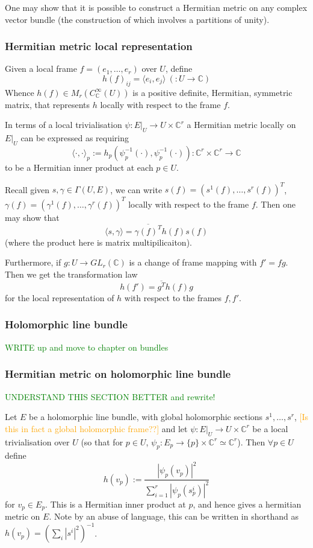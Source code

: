 \documentclass[a4paper]{article}
\theoremstyle{definition} \newtheorem*{definition}{Definition}
\theoremstyle{definition} \newtheorem*{definitions}{Definitions}
\theoremstyle{plain} \newtheorem{theorem}{Theorem}[section]
\theoremstyle{plain} \newtheorem{proposition}[theorem]{Proposition}
\theoremstyle{plain} \newtheorem{corollary}[theorem]{Corollary}
\theoremstyle{plain} \newtheorem{lemma}[theorem]{Lemma}
\theoremstyle{plain} \newtheorem{example}[theorem]{Example}
\newcommand{\question}[1]{\textcolor{orange}{#1}}
\newcommand{\finish}[1]{\textcolor{green}{#1}}
\newcommand{\complexnos}{\mathbb{C}}
\newcommand{\smoothCmaps}{C^\infty_\complexnos (U)}
\begin{document}
One may show that it is possible to construct a Hermitian metric on any complex vector bundle (the construction of which involves a partitions of unity). 

\subsubsection{Hermitian metric local representation}
Given a local frame $f=(e_1, \ldots, e_r)$ over $U$, define 
$$h(f)_{ij}=\langle e_i, e_j \rangle \ (:U\to \complexnos)$$
Whence $h(f)\in M_r(\smoothCmaps)$ is a positive definite, Hermitian, symmetric matrix, that represents $h$ locally with respect to the frame $f$. 

In terms of a local trivialisation $\psi:E|_U\to U\times \complexnos^r$ a Hermitian metric locally on $E|_U$ can be expressed as requiring
$$\langle \cdot, \cdot \rangle_p := h_p(\psi^{-1}_p(\cdot), \psi^{-1}_p(\cdot)):\complexnos^r \times \complexnos^r \to \complexnos$$
to be a Hermitian inner product at each $p\in U$. 

Recall given $s, \gamma\in \Gamma(U, E)$, we can write $s(f)=(s^1(f), \ldots, s^r(f))^T$, $\gamma(f)=(\gamma^1(f), \ldots, \gamma^r(f))^T$ locally with respect to the frame $f$. Then one may show that 
$$\langle s, \gamma \rangle = \overline{\gamma(f)^T}h(f)s(f)$$
(where the product here is matrix multipilicaiton).

Furthermore, if $g:U\to GL_r(\complexnos)$ is a change of frame mapping with $f'=fg$. Then we get the transformation law
$$h(f')=\overline{g^T}h(f)g$$
for the local representation of $h$ with respect to the frames $f, f'$.

\subsubsection{Holomorphic line bundle}
\finish{WRITE up and move to chapter on bundles}

\subsubsection{Hermitian metric on holomorphic line bundle}
\finish{UNDERSTAND THIS SECTION BETTER and rewrite!}

Let $E$ be a holomorphic line bundle, with global holomorphic sections $s^1, \ldots, s^r$, \question{[Is this in fact a global holomorphic frame??]} and let $\psi:E|_U\to U\times \complexnos^r$ be a local trivialisation over $U$ (so that for $p\in U$, $\psi_p:E_p\to \{p\}\times \complexnos^r \simeq \complexnos^r$). Then $\forall p\in U$ define
$$h(v_p):=\frac{|\psi_p(v_p)|^2}{\sum_{i=1}^r |\psi_p (s^i_p)|^2}$$
for $v_p\in E_p$. This is a Hermitian inner product at $p$, and hence gives a hermitian metric on $E$. Note by an abuse of language, this can be written in shorthand as $h(v_p)=(\sum_i |s^i|^2)^{-1}$.
\end{document}

